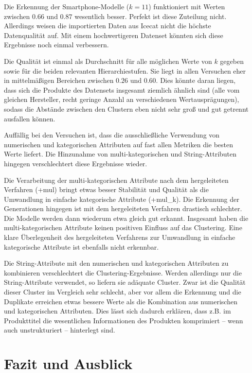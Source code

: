 Die Erkennung der Smartphone-Modelle (\(k=11\)) funktioniert mit Werten
zwischen \(0.66\) und \(0.87\) wesentlich besser. Perfekt ist diese
Zuteilung nicht. Allerdings weisen die importierten Daten aus Icecat
nicht die höchste Datenqualität auf. Mit einem hochwertigeren Datenset
könnten sich diese Ergebnisse noch einmal verbessern.

Die Qualität ist einmal als Durchschnitt für alle möglichen Werte von
\(k\) gegeben sowie für die beiden relevanten Hierarchiestufen. Sie
liegt in allen Versuchen eher in mittelmäßigen Bereichen zwischen
\(0.26\) und \(0.60\). Dies könnte daran liegen, dass sich die Produkte
des Datensets insgesamt ziemlich ähnlich sind (alle vom gleichen
Hersteller, recht geringe Anzahl an verschiedenen Wertausprägungen),
sodass die Abstände zwischen den Clustern eben nicht sehr groß und gut
getrennt ausfallen können.

Auffällig bei den Versuchen ist, dass die ausschließliche Verwendung von
numerischen und kategorischen Attributen auf fast allen Metriken die
besten Werte liefert. Die Hinzunahme von multi-kategorischen und
String-Attributen hingegen verschlechtert diese Ergebnisse wieder.

Die Verarbeitung der multi-kategorischen Attribute nach dem
hergeleiteten Verfahren (+mul) bringt etwas besser Stabilität und
Qualität als die Umwandlung in einfache kategorische Attribute
(+mul\_k). Die Erkennung der Generationen hingegen ist mit dem
hergeleiteten Verfahren drastisch schlechter. Die Modelle werden dann
wiederum etwa gleich gut erkannt. Insgesamt haben die
multi-kategorischen Attribute keinen positiven Einfluss auf das
Clustering. Eine klare Überlegenheit des hergeleiteten Verfahrens zur
Umwandlung in einfache kategorische Attribute ist ebenfalls nicht
erkennbar.

Die String-Attribute mit den numerischen und kategorischen Attributen zu
kombinieren verschlechtert die Clustering-Ergebnisse. Werden allerdings
nur die String-Attribute verwendet, so liefern sie adäquate Cluster.
Zwar ist die Qualität dieser Cluster im Vergleich sehr schlecht, aber
vor allem die Erkennung und die Duplikate erreichen etwas bessere Werte
als die Kombination aus numerischen und kategorischen Attributen. Dies
lässt sich dadurch erklären, dass z.B. im Produkttitel die wesentlichen
Informationen des Produkten komprimiert -- wenn auch unstrukturiert --
hinterlegt sind.

\hypertarget{fazit-und-ausblick}{%
\section{Fazit und Ausblick}\label{fazit-und-ausblick}}

